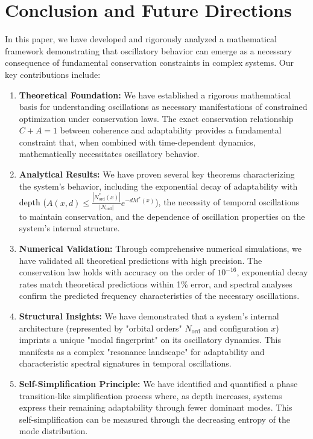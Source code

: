 \documentclass[11pt,a4paper]{article}
\begin{document}
\section{Conclusion and Future Directions}

In this paper, we have developed and rigorously analyzed a mathematical framework demonstrating that oscillatory behavior can emerge as a necessary consequence of fundamental conservation constraints in complex systems. Our key contributions include:

\begin{enumerate}
    \item \textbf{Theoretical Foundation:} We have established a rigorous mathematical basis for understanding oscillations as necessary manifestations of constrained optimization under conservation laws. The exact conservation relationship $C+A=1$ between coherence and adaptability provides a fundamental constraint that, when combined with time-dependent dynamics, mathematically necessitates oscillatory behavior.

    \item \textbf{Analytical Results:} We have proven several key theorems characterizing the system's behavior, including the exponential decay of adaptability with depth ($A(x,d) \leq \frac{|N_{\text{ord}}^*(x)|}{|N_{\text{ord}}|} e^{-d M^*(x)}$), the necessity of temporal oscillations to maintain conservation, and the dependence of oscillation properties on the system's internal structure.

    \item \textbf{Numerical Validation:} Through comprehensive numerical simulations, we have validated all theoretical predictions with high precision. The conservation law holds with accuracy on the order of $10^{-16}$, exponential decay rates match theoretical predictions within 1\% error, and spectral analyses confirm the predicted frequency characteristics of the necessary oscillations.

    \item \textbf{Structural Insights:} We have demonstrated that a system's internal architecture (represented by "orbital orders" $N_{\text{ord}}$ and configuration $x$) imprints a unique "modal fingerprint" on its oscillatory dynamics. This manifests as a complex "resonance landscape" for adaptability and characteristic spectral signatures in temporal oscillations.

    \item \textbf{Self-Simplification Principle:} We have identified and quantified a phase transition-like simplification process where, as depth increases, systems express their remaining adaptability through fewer dominant modes. This self-simplification can be measured through the decreasing entropy of the mode distribution.
\end{enumerate}
\end{document}
